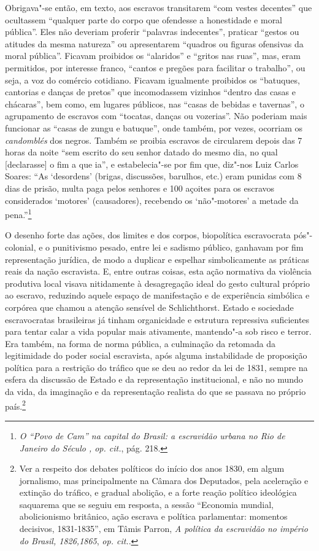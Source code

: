 Obrigava"-se então, em texto, aos escravos transitarem ``com vestes
decentes'' que ocultassem ``qualquer parte do corpo que ofendesse a
honestidade e moral pública''. Eles não deveriam proferir ``palavras
indecentes'', praticar ``gestos ou atitudes da mesma natureza'' ou
apresentarem ``quadros ou figuras ofensivas da moral pública''. Ficavam
proibidos os ``alaridos'' e ``gritos nas ruas'', mas, eram permitidos,
por interesse franco, ``cantos e pregões para facilitar o trabalho'', ou
seja, a voz do comércio cotidiano. Ficavam igualmente proibidos os
``batuques, cantorias e danças de pretos'' que incomodassem vizinhos
``dentro das casas e chácaras'', bem como, em lugares públicos, nas
``casas de bebidas e tavernas'', o agrupamento de escravos com
``tocatas, danças ou vozerias''. Não poderiam mais funcionar as ``casas
de zungu e batuque'', onde também, por vezes, ocorriam os
\emph{candomblés} dos negros. Também se proibia escravos de circularem
depois das 7 horas da noite ``sem escrito do seu senhor datado do mesmo
dia, no qual {[}declarasse{]} o fim a que ia'', e estabelecia"-se por fim
que, diz"-nos Luiz Carlos Soares: ``As `desordens' (brigas, discussões,
barulhos, etc.) eram punidas com 8 dias de prisão, multa paga pelos
senhores e 100 açoites para os escravos considerados `motores'
(causadores), recebendo os `não"-motores' a metade da pena.''\footnote{\emph{O
  ``Povo de Cam'' na capital do Brasil: a escravidão urbana no Rio de
  Janeiro do Século , op. cit.}, pág. 218.}

O desenho forte das ações, dos limites e dos corpos, biopolítica
escravocrata pós"-colonial, e o punitivismo pesado, entre lei e sadismo
público, ganhavam por fim representação jurídica, de modo a duplicar e
espelhar simbolicamente as práticas reais da nação escravista. E, entre
outras coisas, esta ação normativa da violência produtiva local visava
nitidamente à desagregação ideal do gesto cultural próprio ao escravo,
reduzindo aquele espaço de manifestação e de experiência simbólica e
corpórea que chamou a atenção sensível de Schlichthorst. Estado e
sociedade escravocratas brasileiras já tinham organicidade e estrutura
repressiva suficientes para tentar calar a vida popular mais ativamente,
mantendo"-a sob risco e terror. Era também, na forma de norma pública, a
culminação da retomada da legitimidade do poder social escravista, após
alguma instabilidade de proposição política para a restrição do tráfico
que se deu ao redor da lei de 1831, sempre na esfera da discussão de
Estado e da representação institucional, e não no mundo da vida, da
imaginação e da representação realista do que se passava no próprio
país.\footnote{Ver a respeito dos debates políticos do início dos anos
  1830, em algum jornalismo, mas principalmente na Câmara dos Deputados,
  pela aceleração e extinção do tráfico, e gradual abolição, e a forte
  reação político ideológica saquarema que se seguiu em resposta, a
  sessão ``Economia mundial, abolicionismo britânico, ação escrava e
  política parlamentar: momentos decisivos, 1831-1835'', em Tâmis
  Parron, \emph{A política da escravidão no império do Brasil,
  1826,1865}, \emph{op. cit.}.}

